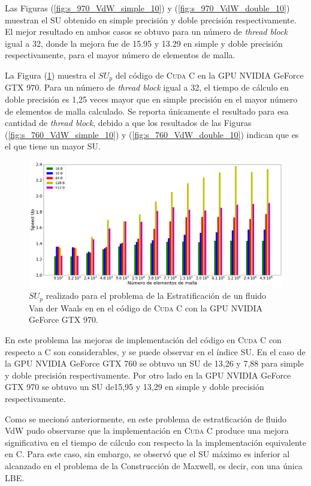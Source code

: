 \newpage

Las Figuras (\ref{fig:s_970_VdW_simple_10}) y (\ref{fig:s_970_VdW_double_10}) muestran el SU obtenido en simple precisión y doble precisión respectivamente. El mejor resultado en ambos casos se obtuvo para un número de \textit{thread block} igual a 32, donde la mejora fue de 15.95 y 13.29 en simple y doble precisión respectivamente, para el mayor número de elementos de malla.

La Figura (\ref{fig:c_970_VdW_cuda_10}) muestra el ${SU}_p$ del código de \textsc{Cuda C} en la GPU NVIDIA GeForce GTX 970. Para un número de \textit{thread block} igual a 32, el tiempo de cálculo en doble precisión es 1,25 veces mayor que en simple precisión en el mayor número de elementos de malla calculado. Se reporta únicamente el resultado para esa cantidad de \textit{thread block}, debido a que los resultados de las Figuras (\ref{fig:s_760_VdW_simple_10}) y (\ref{fig:s_760_VdW_double_10}) indican que es el que tiene un mayor SU.


\begin{figure}[h!]
	\centering
	\includegraphics[width=\textwidth]{figs_2/cap4/c_970_VdW_cuda_10}
	\caption{$SU_p$ realizado para el problema de la Estratificación de un fluido Van der Waals en en el código de \textsc{Cuda C} con la GPU NVIDIA GeForce GTX 970.} 
	\label{fig:c_970_VdW_cuda_10}	
\end{figure}


En este problema las mejoras de implementación del código en \textsc{Cuda C} con respecto a \textsc{C} son considerables, y se puede observar en el índice SU. En el caso de la GPU NVIDIA GeForce GTX 760 se obtuvo un SU de 13,26 y 7,88 para simple y doble precisión respectivamente. Por otro lado en la GPU NVIDIA GeForce GTX 970 se obtuvo un SU de15,95 y 13,29 en simple y doble precisión respectivamente.

Como se mecionó anteriormente, en este problema de estratficación de fluido VdW pudo observarse que la implementación en \textsc{Cuda C} produce una mejora significativa en el tiempo de cálculo con respecto la la implementación equivalente en \textsc{C}. Para este caso, sin embargo, se observó que el SU máximo es inferior al alcanzado en el problema de la Construcción de Maxwell, es decir, con una única LBE.

